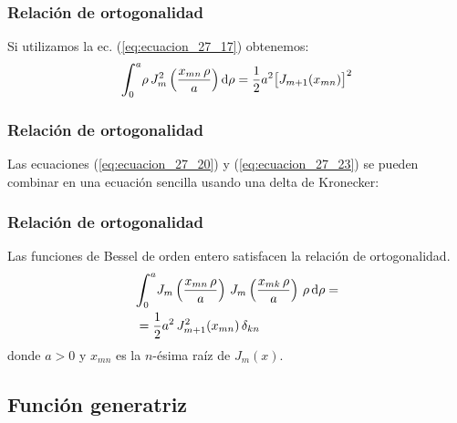 \documentclass[12pt]{beamer}
\begin{document}
\begin{frame}
\frametitle{Relación de ortogonalidad}
Si utilizamos la ec. (\ref{eq:ecuacion_27_17}) obtenemos:
\pause
\begin{equation}
\scaleint{6ex}_{\bs 0}^{a} \rho \, J_{m}^{2} \left(\dfrac{x_{mn} \, \rho}{a}   \right) \dd{\rho} = \dfrac{1}{2} a^{2} \big[ J_{m+1} (x_{mn}) \big]^{2}
\label{eq:ecuacion_27_23}
\end{equation}
\end{frame}
\begin{frame}
\frametitle{Relación de ortogonalidad}
Las ecuaciones (\ref{eq:ecuacion_27_20}) y (\ref{eq:ecuacion_27_23}) se pueden combinar en una ecuación sencilla usando una delta de Kronecker:
\end{frame}
\begin{frame}
\frametitle{Relación de ortogonalidad}
\begin{tcolorbox}
Las funciones de Bessel de orden entero satisfacen la relación de ortogonalidad.
\begin{eqnarray}
\begin{aligned}
&\scaleint{6ex}_{\bs 0}^{a} J_{m} \left(\dfrac{x_{mn} \, \rho}{a} \right) \, J_{m} \left(\dfrac{x_{mk} \, \rho}{a} \right) \, \rho \dd{\rho} = \\
&= \dfrac{1}{2} a^{2} \, J_{m+1}^{2} (x_{mn}) \, \delta_{kn}
\end{aligned}
\label{eq:ecuacion_27_24}
\end{eqnarray}
donde $a > 0$ y $x_{mn}$ es la $n$-ésima raíz de $J_{m}(x)$.
\end{tcolorbox}
\end{frame}

\subsection{Función generatriz}
\end{document}
